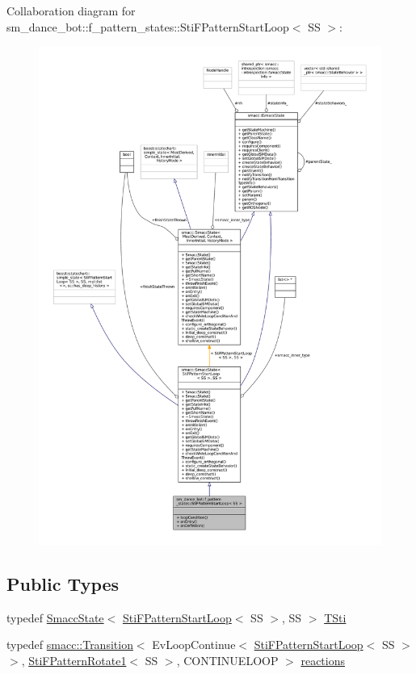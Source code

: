 Collaboration diagram for sm\+\_\+dance\+\_\+bot\+:\+:f\+\_\+pattern\+\_\+states\+:\+:Sti\+F\+Pattern\+Start\+Loop$<$ SS $>$\+:
\nopagebreak
\begin{figure}[H]
\begin{center}
\leavevmode
\includegraphics[width=350pt]{structsm__dance__bot_1_1f__pattern__states_1_1StiFPatternStartLoop__coll__graph}
\end{center}
\end{figure}
\subsection*{Public Types}
\begin{DoxyCompactItemize}
\item 
typedef \hyperlink{classSmaccState}{Smacc\+State}$<$ \hyperlink{structsm__dance__bot_1_1f__pattern__states_1_1StiFPatternStartLoop}{Sti\+F\+Pattern\+Start\+Loop}$<$ SS $>$, SS $>$ \hyperlink{structsm__dance__bot_1_1f__pattern__states_1_1StiFPatternStartLoop_a18f1bcdd4f45d9230c9b23b6153ae9e2}{T\+Sti}
\item 
typedef \hyperlink{classsmacc_1_1Transition}{smacc\+::\+Transition}$<$ Ev\+Loop\+Continue$<$ \hyperlink{structsm__dance__bot_1_1f__pattern__states_1_1StiFPatternStartLoop}{Sti\+F\+Pattern\+Start\+Loop}$<$ SS $>$ $>$, \hyperlink{structsm__dance__bot_1_1f__pattern__states_1_1StiFPatternRotate1}{Sti\+F\+Pattern\+Rotate1}$<$ SS $>$, C\+O\+N\+T\+I\+N\+U\+E\+L\+O\+OP $>$ \hyperlink{structsm__dance__bot_1_1f__pattern__states_1_1StiFPatternStartLoop_a90229e6dfa09f3f177f633072a9af069}{reactions}
\end{DoxyCompactItemize}
